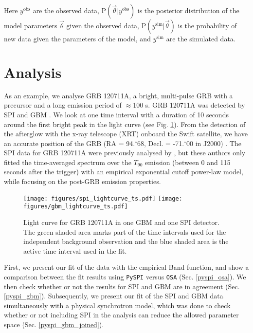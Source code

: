 \documentclass{aa}
\def\fdg{\hbox{$.\!\!^\circ$}}          %
\begin{document}
\noindent
Here $y^{\textrm{obs}}$ are the observed data, $\textrm{P}(\vec{\theta}|y^{\textrm{obs}})$ is the posterior distribution of the model parameters $\vec{\theta}$ given the observed data, $\textrm{P}(y^{\textrm{sim}}|\vec{\theta})$ is the probability of new data given the parameters of the model, and $y^{\textrm{sim}}$ are the simulated data.

\section{Analysis}
\label{analysis}
As an example, we analyse GRB 120711A, a bright, multi-pulse GRB with a precursor and a long emission period of $\approx$100 s. GRB 120711A was detected by SPI and GBM \citep{GCN_integral, GCN_gbm}.
We look at one time interval with a duration of 10 seconds around the first bright peak in the light curve (see Fig. \ref{fig:time_selection}). From the detection of the afterglow with the x-ray telescope (XRT) onboard the Swift satellite, we have an accurate position of the GRB (RA = 94\fdg68, Decl. = -71\fdg00 in J2000) \citep{GCN_swift}. The SPI data for GRB 120711A were previously analysed by \citet{Martin-Carrillo-2014}, but these authors only fitted the time-averaged spectrum over the $T_{90}$ emission (between 0 and 115 seconds after the trigger) with an empirical exponential cutoff power-law model, while focusing on the post-GRB emission properties.

\begin{figure}
  \begin{centering}
    \texttt{[image: figures/spi\_lightcurve\_ts.pdf]}
    \texttt{[image: figures/gbm\_lightcurve\_ts.pdf]}
    \caption{Light curve for GRB 120711A in one GBM and one SPI detector. The green shaded area marks part of the time intervals used for the independent background observation and the blue shaded area is the active time interval used in the fit.}
    \label{fig:time_selection}
  \end{centering}
\end{figure}

First, we present our fit of the data with the empirical Band function, and show a comparison between the fit results using {\tt PySPI} versus {\tt OSA} (Sec. \ref{pyspi_osa}). We then check whether or not the results for SPI and GBM are in agreement (Sec. \ref{pyspi_gbm}). Subsequently, we present our fit of the SPI and GBM data simultaneously with a physical synchrotron model, which was done to check whether or not including SPI in the analysis can reduce the allowed parameter space (Sec. \ref{pyspi_gbm_joined}).
\end{document}
